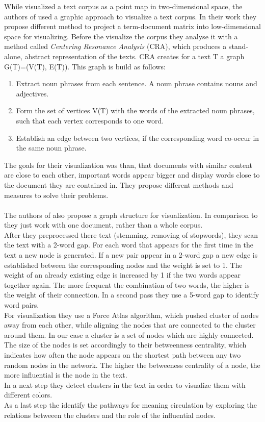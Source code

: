 While \cite{visualiuationCorpus1} visualized a text corpus as a point map in two-dimensional space,  the authors of \cite{visualiuationCorpus2} used a graphic approach to visualize a text corpus. In their work they propose different method to project a term-document matrix into low-dimensional space for visualizing. Before the visualize the corpus they analyse it with a method called \textit{Centering Resonance Analysis} (CRA), which produces a stand-alone, abstract representation of the texts. CRA creates for a text T a graph G(T)=(V(T), E(T)). This graph is build as follows:
\begin{enumerate}
	\item Extract noun phrases from each sentence. A noun phrase contains nouns and adjectives. 
	\item Form the set of vertices V(T) with the words of the extracted noun phrases, such that each vertex corresponds to one word. 
	\item Establish an edge between two vertices, if the corresponding word co-occur in the same noun phrase.
\end{enumerate}

The goals for their visualization was than, that documents with similar content are close to each other, important words appear bigger and display words close to the document they are contained in. 
They propose different methods and measures to solve their problems. \\
~\\
The authors of \cite{visualiuationCorpus3}  also propose a graph structure for visualization. In comparison to \cite{visualiuationCorpus2} they just work with one document, rather than a whole corpus. \\
After they preprocessed there text (stemming, removing of stopwords), they scan the text with a 2-word gap. For each word that appears for the first time in the text a new node is generated. If a new pair appear in a 2-word gap a new edge is established between the corresponding nodes and the weight is set to 1. The weight of an already existing edge is increased by 1 if the two words appear together again. The more frequent the combination of two words, the higher is the weight of their connection. In a second pass they use a 5-word gap to identify word pairs. \\
For visualization they use a Force Atlas algorithm, which pushed cluster of nodes away from each other, while aligning the nodes that are connected to the cluster around them. In our case a cluster is a set of nodes which are highly connected. \\
The size of the nodes is set accordingly to their betweenness centrality, which indicates how often the node appears on the shortest path between any two random nodes in the network. The higher the betweeness centrality of a node, the more influential is the node in the text. \\
In a next step they detect clusters in the text in order to visualize them with different colors. \\
As a last step the identify the pathways for meaning circulation by exploring the relations betweeen the clusters and the role of the influential nodes.

